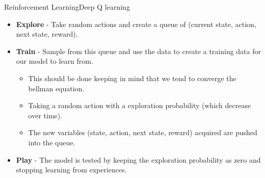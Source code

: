 \documentclass[10pt]{beamer}
\begin{document}


\begin{frame}{Reinforcement Learning}{Deep Q learning}
\begin{itemize}
\item \textbf{Explore} - Take random actions and create a queue of (current state, action, next state, reward).     
\pause
\item \textbf{Train} - Sample from this queue and use the data to create a training data for our model to learn from. 
\begin{itemize}
\pause
\item This should be done keeping in mind that we tend to converge the bellman equation.
\pause
\item Taking a random action with a exploration probability (which decrease over time).
\pause
\item The new variables (state, action, next state, reward) acquired are pushed into the queue. 
\end{itemize}
\pause
\item \textbf{Play} - The model is tested by keeping the exploration probability as zero and stopping learning from experiences.
\end{itemize}

\end{frame}


\end{document}
